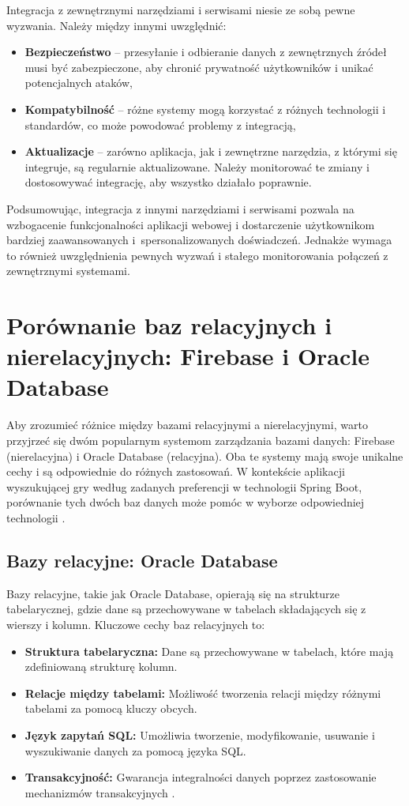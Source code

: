 Integracja z zewnętrznymi narzędziami i serwisami niesie ze sobą pewne wyzwania. Należy między innymi uwzględnić:
\begin{itemize}
\item \textbf{Bezpieczeństwo} -- przesyłanie i odbieranie danych z zewnętrznych źródeł musi być zabezpieczone, aby chronić prywatność użytkowników i unikać potencjalnych ataków,
\item \textbf{Kompatybilność} -- różne systemy mogą korzystać z różnych technologii i standardów, co może powodować problemy z integracją,
\item \textbf{Aktualizacje} -- zarówno aplikacja, jak i zewnętrzne narzędzia, z którymi się integruje, są regularnie aktualizowane. Należy monitorować te zmiany i dostosowywać integrację, aby wszystko działało poprawnie.
\end{itemize}
Podsumowując, integracja z innymi narzędziami i serwisami pozwala na wzbogacenie funkcjonalności aplikacji webowej i dostarczenie użytkownikom bardziej zaawansowanych i~spersonalizowanych doświadczeń. Jednakże wymaga to również uwzględnienia pewnych wyzwań i stałego monitorowania połączeń z zewnętrznymi systemami.

\section{Porównanie baz relacyjnych i nierelacyjnych: Firebase i Oracle Database}

Aby zrozumieć różnice między bazami relacyjnymi a nierelacyjnymi, warto przyjrzeć się dwóm popularnym systemom zarządzania bazami danych: Firebase (nierelacyjna) i Oracle Database (relacyjna). Oba te systemy mają swoje unikalne cechy i są odpowiednie do różnych zastosowań. W kontekście aplikacji wyszukującej gry według zadanych preferencji w technologii Spring Boot, porównanie tych dwóch baz danych może pomóc w wyborze odpowiedniej technologii \cite{diffs}.

\subsection{Bazy relacyjne: Oracle Database}

Bazy relacyjne, takie jak Oracle Database, opierają się na strukturze tabelarycznej, gdzie dane są przechowywane w tabelach składających się z wierszy i kolumn. Kluczowe cechy baz relacyjnych to:

\begin{itemize}
\item \textbf{Struktura tabelaryczna:} Dane są przechowywane w tabelach, które mają zdefiniowaną strukturę kolumn.
\item \textbf{Relacje między tabelami:} Możliwość tworzenia relacji między różnymi tabelami za pomocą kluczy obcych.
\item \textbf{Język zapytań SQL:} Umożliwia tworzenie, modyfikowanie, usuwanie i wyszukiwanie danych za pomocą języka SQL.
\item \textbf{Transakcyjność:} Gwarancja integralności danych poprzez zastosowanie mechanizmów transakcyjnych \cite{oracleDb}.
\end{itemize}

